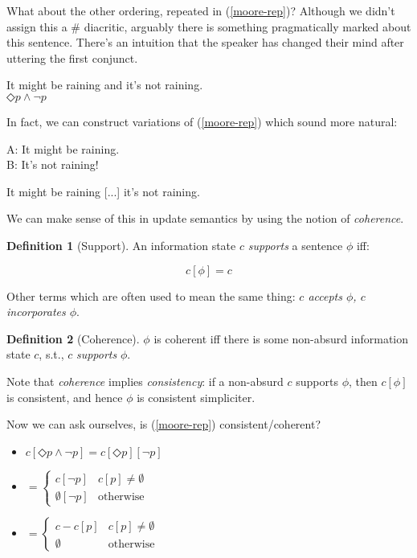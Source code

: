 \documentclass[nols,twoside,nofonts,nobib,nohyper]{tufte-handout}
\theoremstyle{definition}
\newtheorem{definition}{Definition}[section]
\begin{document}
What about the other ordering, repeated in (\ref{moore-rep})? Although we didn't assign this a $\#$ diacritic, arguably there is something pragmatically marked about this sentence. There's an intuition that the speaker has changed their mind after uttering the first conjunct.

\ex
{}It might be raining and it's not raining.\\
$◇ p ∧ ¬ p$\label{moore-rep}
\xe

In fact, we can construct variations of (\ref{moore-rep}) which sound more natural:

\ex
A: It might be raining.\\
B: It's not raining!
\xe

\ex
It might be raining [...] it's not raining.
\xe

We can make sense of this in update semantics by using the notion of \textit{coherence}.


\begin{definition}[Support]
  An information state $c$ \textit{supports} a sentence $ϕ$ iff:

  $$c[ϕ] = c$$

  Other terms which are often used to mean the same thing: \textit{$c$ accepts $\phi$, $c$ incorporates $\phi$}.
\end{definition}

\begin{definition}[Coherence]
$ϕ$ is coherent iff there is some non-absurd information state $c$, s.t., $c$ \textit{supports} $ϕ$.
\end{definition}

Note that \textit{coherence} implies \textit{consistency}: if a non-absurd $c$ supports $ϕ$, then $c[ϕ]$ is consistent, and hence $ϕ$ is consistent simpliciter.

Now we can ask ourselves, is (\ref{moore-rep}) consistent/coherent?

\begin{itemize}
    \item $c[◇ p ∧ ¬ p] = c[◇ p][¬ p]$
  \item $= \begin{cases}
    c[¬ p]&c[p] ≠ ∅\\
    ∅[¬ p]&\text{otherwise}
   \end{cases}$
  \item $= \begin{cases}
    c - c[p]&c[p] ≠ ∅\\
    ∅&\text{otherwise}
    \end{cases}$
\end{itemize}
\end{document}
